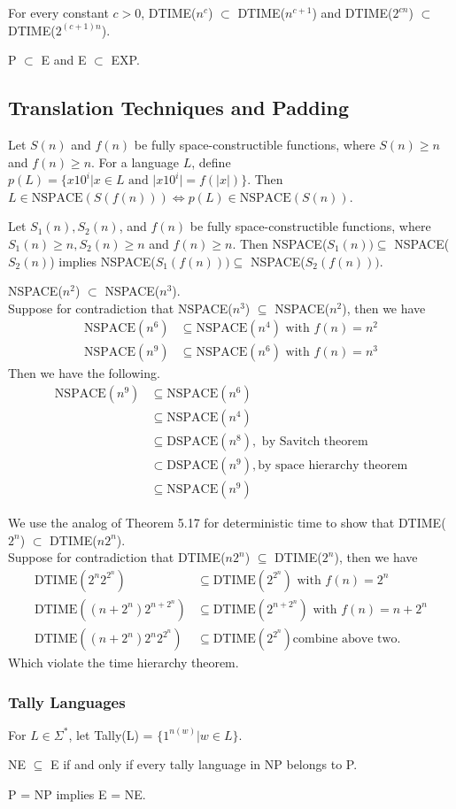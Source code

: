  For every constant $c > 0$, DTIME($n^c$) $\subset$ DTIME($n^{c+1}$) and
DTIME($2^{cn}$) $\subset$ DTIME($2^{(c+1)n}$).

 P $\subset$ E and E $\subset$ EXP.

\subsection{Translation Techniques and Padding}

 Let $S(n)$ and $f(n)$ be fully space-constructible functions, where
$S(n) \ge n$ and $f(n) \ge n$. For a language $L$, define
$p(L) = \{x10^i | x \in L \text{ and }|x10^i | = f(|x|)\}$.
Then $L \in \text{NSPACE}(S(f(n))) \Leftrightarrow p(L) \in \text{NSPACE}(S(n))$.

 Let $S_1(n), S_2(n)$, and $f(n)$ be fully space-constructible functions,
where $S_1 (n) \ge n, S_2(n) \ge n$ and $f(n) \ge n$. Then
NSPACE($S_1(n)) \subseteq$ NSPACE($S_2(n)$) implies NSPACE($S_1(f(n)))
\subseteq$ NSPACE($S_2(f(n)))$.

 NSPACE($n^2$) $\subset$ NSPACE($n^3$).\\
Suppose for contradiction that NSPACE($n^3$) $\subseteq$ NSPACE($n^2$), then we 
have
\begin{align*}
  \text{NSPACE}(n^6) &\subseteq \text{NSPACE}(n^4) \text{ with } f(n)=n^2\\
  \text{NSPACE}(n^9) &\subseteq \text{NSPACE}(n^6) \text{ with } f(n)=n^3
\end{align*}
Then we have the following.
\begin{align*}
\text{NSPACE}(n^9) &\subseteq \text{NSPACE}(n^6) \\
&\subseteq \text{NSPACE}(n^4) \\
&\subseteq \text{DSPACE}(n^8), \text{ by Savitch theorem} \\
&\subset \text{DSPACE}(n^9), \text{by space hierarchy theorem} \\
&\subseteq \text{NSPACE}(n^9)
\end{align*}

 We use the analog of Theorem 5.17 for deterministic time to show
that DTIME($2^n$) $\subset$ DTIME($n2^n$).\\
Suppose for contradiction that DTIME($n2^n$) $\subseteq$ DTIME($2^n$), then we have 
\begin{align*}
\text{DTIME}(2^n2^{2^n}) &\subseteq \text{DTIME}(2^{2^n}) \text{ with } f(n) = 2^n\\
\text{DTIME}((n+2^n)2^{n+2^n}) &\subseteq \text{DTIME}(2^{n+2^n}) \text{ with }
f(n) = n+2^n\\
\text{DTIME}((n+2^n)2^{n}2^{2^n}) &\subseteq \text{DTIME}(2^{2^n}) \text{
combine above two.}
\end{align*}
Which violate the time hierarchy theorem.

\subsubsection{Tally Languages}

 For $L \in \Sigma^*$, let Tally(L) = $\{1^{n(w)} | w \in L\}$.

 NE $\subseteq$ E if and only if every tally language in NP belongs
to P.

 P = NP implies E = NE.
